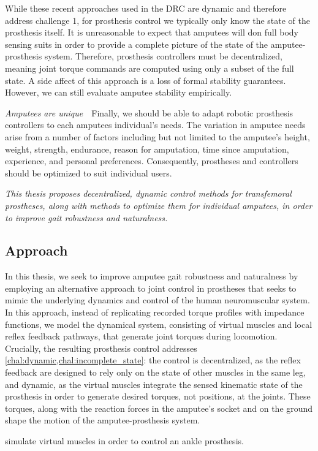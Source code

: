 \begin{challenges}
    While these recent approaches used in the DRC are dynamic and therefore
    address challenge 1, for prosthesis control we typically only know the state
    of the prosthesis itself. It is unreasonable to expect that amputees will
    don full body sensing suits in order to provide a complete picture of the
    state of the amputee-prosthesis system. Therefore, prosthesis controllers
    must be decentralized, meaning joint torque commands are computed using only
    a subset of the full state. A side affect of this approach is a loss of
    formal stability guarantees. However, we can still evaluate amputee
    stability empirically.

    \item\label{chal:amputees_unique} \emph{Amputees are unique}~~Finally, we
    should be able to adapt robotic prosthesis controllers to each amputees
    individual's needs. The variation in amputee needs arise from a number of
    factors including but not limited to the amputee's height, weight, strength,
    endurance, reason for amputation, time since amputation, experience, and
    personal preferences. Consequently, prostheses and controllers should be
    optimized to suit individual users.
\end{challenges}

\vspace{2ex}
\begin{fullwidth} \emph{This thesis proposes decentralized, dynamic control
methods for transfemoral prostheses, along with methods to optimize them for
individual amputees, in order to improve gait robustness and naturalness.}
\end{fullwidth}

\subsection{Approach}\label{sec:intro_approach}

In this thesis, we seek to improve amputee gait robustness and naturalness by
employing an alternative approach to joint control in prostheses that seeks to
mimic the underlying dynamics and control of the human neuromuscular system. In
this approach, instead of replicating recorded torque profiles with impedance
functions, we model the dynamical system, consisting of virtual muscles and
local reflex feedback pathways, that generate joint torques during locomotion.
Crucially, the resulting prosthesis control addresses
\cref{chal:dynamic,chal:incomplete_state}: the control is decentralized, as the
reflex feedback are designed to rely only on the state of other muscles in the
same leg, and dynamic, as the virtual muscles integrate the sensed kinematic
state of the prosthesis in order to generate desired torques, not positions, at
the joints. These torques, along with the reaction forces in the amputee's
socket and on the ground shape the motion of the amputee-prosthesis system.
\begin{marginfigure}
    \centering
    \caption{\citet{eilenberg2010control} simulate virtual muscles in
    order to control an ankle prosthesis.}
    \label{fig:eilenberg_muscle}
\end{marginfigure}

